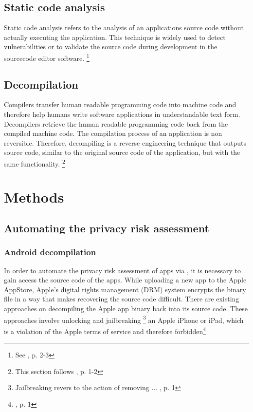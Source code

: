 \documentclass[
	a4paper,
	oneside,
	12pt,
	liststotocnumbered
]{article}
\let\cite\textcite
\begin{document}
\subsection{Static code analysis}

Static code analysis refers to the analysis of an applications source code without actually executing the application. 
This technique is widely used to detect vulnerabilities or to validate the source code during development in the sourcecode editor software. \footnote{See \cite{bardas2010static}, p. 2-3}

\subsection{Decompilation}

Compilers transfer human readable programming code into machine code and therefore help humans write software applications in understandable text form. 
Decompilers retrieve the human readable programming code back from the compiled machine code. 
The compilation process of an application is non reversible. Therefore, decompiling is a reverse engineering technique that outputs source code, similar to the original source code of the application, but with the same functionality.  
\footnote{This section follows \cite{nolan2012decompiling}, p. 1-2}

\section{Methods}

\subsection{Automating the privacy risk assessment}

\subsubsection{Android decompilation}

In order to automate the privacy risk assessment of \mH apps via \sca, it is necessary to gain access the source code of the apps. 
While uploading a new app to the Apple AppStore, Apple's digital rights management (\acs{DRM}) system encrypts the binary file in a way that makes recovering the source code difficult. 
There are existing approaches on decompiling the Apple app binary back into its source code.
These approaches involve unlocking and jailbreaking
\footnote{Jailbreaking revers to the action of removing ... \cite{Kweller2010}, p. 1}
an Apple iPhone or iPad, which is a violation of the Apple terms of service and therefore forbidden\footnote{\cite{Kweller2010}, p. 1}
\end{document}
